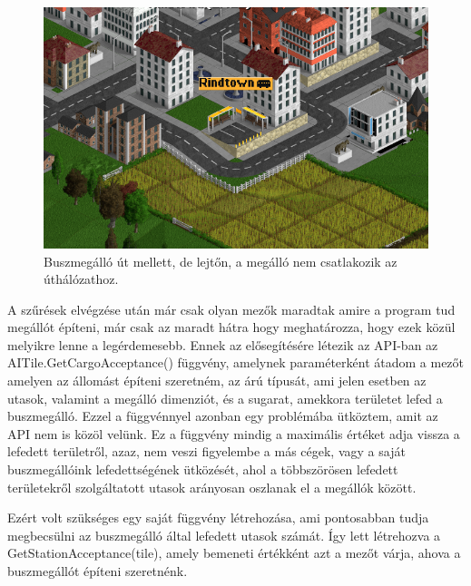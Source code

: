 \begin{figure}
	\centering
	\includegraphics[scale=0.8]{images/lejtomegallo.png}
	\caption{Buszmegálló út mellett, de lejtőn, a megálló nem csatlakozik az úthálózathoz.}
	\label{fig:lejtomegallo}
\end{figure}

A szűrések elvégzése után már csak olyan mezők maradtak amire a program tud megállót építeni, már csak az maradt hátra hogy meghatározza, hogy ezek közül melyikre lenne a legérdemesebb. Ennek az elősegítésére létezik az API-ban az AITile.GetCargoAcceptance() függvény, amelynek paraméterként átadom a mezőt amelyen az állomást építeni szeretném, az árú típusát, ami jelen esetben az utasok, valamint a megálló dimenziót, és a sugarat, amekkora területet lefed a buszmegálló. Ezzel a függvénnyel azonban egy problémába ütköztem, amit az API nem is közöl velünk. Ez a függvény mindig a maximális értéket adja vissza a lefedett területről, azaz, nem veszi figyelembe a más cégek, vagy a saját buszmegállóink lefedettségének ütközését, ahol a többszörösen lefedett területekről szolgáltatott utasok arányosan oszlanak el a megállók között.

Ezért volt szükséges egy saját függvény létrehozása, ami pontosabban tudja megbecsülni az buszmegálló által lefedett utasok számát. Így lett létrehozva a GetStationAcceptance(tile), amely bemeneti értékként azt a mezőt várja, ahova a buszmegállót építeni szeretnénk.

